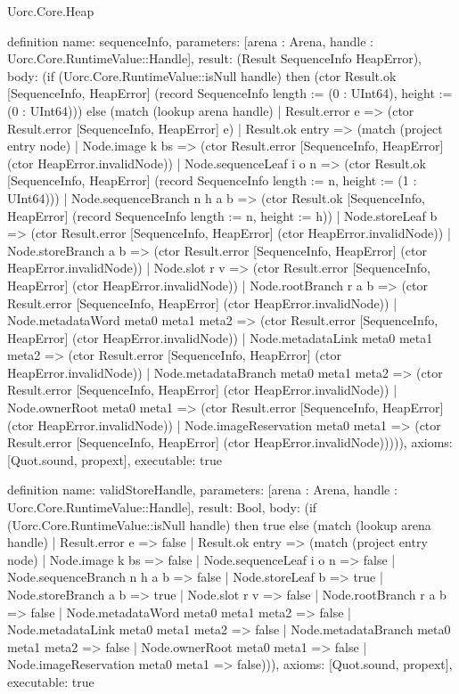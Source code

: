 \begin{lexlean}{Uorc.Core.Heap}
\begin{semanticmodule}
definition{
  name: sequenceInfo,
  parameters: [arena : Arena, handle : Uorc.Core.RuntimeValue::Handle],
  result: (Result SequenceInfo HeapError),
  body: (if (Uorc.Core.RuntimeValue::isNull handle) then (ctor Result.ok [SequenceInfo, HeapError] (record SequenceInfo {length := (0 : UInt64), height := (0 : UInt64)})) else (match (lookup arena handle)
    | Result.error e => (ctor Result.error [SequenceInfo, HeapError] e)
    | Result.ok entry => (match (project entry node)
      | Node.image k bs => (ctor Result.error [SequenceInfo, HeapError] (ctor HeapError.invalidNode))
      | Node.sequenceLeaf i o n => (ctor Result.ok [SequenceInfo, HeapError] (record SequenceInfo {length := n, height := (1 : UInt64)}))
      | Node.sequenceBranch n h a b => (ctor Result.ok [SequenceInfo, HeapError] (record SequenceInfo {length := n, height := h}))
      | Node.storeLeaf b => (ctor Result.error [SequenceInfo, HeapError] (ctor HeapError.invalidNode))
      | Node.storeBranch a b => (ctor Result.error [SequenceInfo, HeapError] (ctor HeapError.invalidNode))
      | Node.slot r v => (ctor Result.error [SequenceInfo, HeapError] (ctor HeapError.invalidNode))
      | Node.rootBranch r a b => (ctor Result.error [SequenceInfo, HeapError] (ctor HeapError.invalidNode))
      | Node.metadataWord meta0 meta1 meta2 => (ctor Result.error [SequenceInfo, HeapError] (ctor HeapError.invalidNode))
      | Node.metadataLink meta0 meta1 meta2 => (ctor Result.error [SequenceInfo, HeapError] (ctor HeapError.invalidNode))
      | Node.metadataBranch meta0 meta1 meta2 => (ctor Result.error [SequenceInfo, HeapError] (ctor HeapError.invalidNode))
      | Node.ownerRoot meta0 meta1 => (ctor Result.error [SequenceInfo, HeapError] (ctor HeapError.invalidNode))
      | Node.imageReservation meta0 meta1 => (ctor Result.error [SequenceInfo, HeapError] (ctor HeapError.invalidNode))))),
  axioms: [Quot.sound, propext],
  executable: true
}

definition{
  name: validStoreHandle,
  parameters: [arena : Arena, handle : Uorc.Core.RuntimeValue::Handle],
  result: Bool,
  body: (if (Uorc.Core.RuntimeValue::isNull handle) then true else (match (lookup arena handle)
    | Result.error e => false
    | Result.ok entry => (match (project entry node)
      | Node.image k bs => false
      | Node.sequenceLeaf i o n => false
      | Node.sequenceBranch n h a b => false
      | Node.storeLeaf b => true
      | Node.storeBranch a b => true
      | Node.slot r v => false
      | Node.rootBranch r a b => false
      | Node.metadataWord meta0 meta1 meta2 => false
      | Node.metadataLink meta0 meta1 meta2 => false
      | Node.metadataBranch meta0 meta1 meta2 => false
      | Node.ownerRoot meta0 meta1 => false
      | Node.imageReservation meta0 meta1 => false))),
  axioms: [Quot.sound, propext],
  executable: true
}


\end{semanticmodule}
\end{lexlean}
